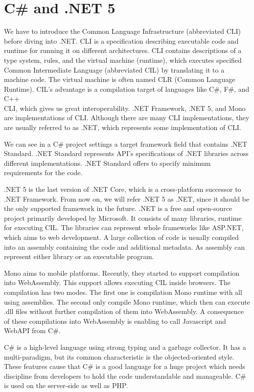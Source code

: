 \section{C\# and .NET 5}

We have to introduce the Common Language Infrastructure (abbreviated CLI)  before diving into .NET.
CLI is a specification describing executable code and runtime for running it on different architectures.
CLI contains descriptions of a type system, rules, and the virtual machine (runtime), which executes specified Common Intermediate Language (abbreviated CIL) by translating it to a machine code. 
The virtual machine is often named CLR (Common Language Runtime).
CIL's advantage is a compilation target of languages like C\#, F\#, and C++\\CLI, which gives us great interoperability.
.NET Framework, .NET 5, and Mono are implementations of CLI.
Although there are many CLI implementations, they are usually referred to as .NET, which represents some implementation of CLI.
\par
We can see in a C\# project settings a target framework field that contains .NET Standard.
.NET Standard represents API's specifications of .NET libraries across different implementations.
.NET Standard offers to specify minimum requirements for the code.
\par
.NET 5  is the last version of .NET Core, which is a cross-platform successor to .NET Framework.
From now on, we will refer .NET 5 as .NET, since it should be the only supported framework in the future.
.NET is a free and open-source project primarily developed by Microsoft.
It consists of many libraries, runtime for executing CIL.
The libraries can represent whole frameworks like ASP.NET, which aims to web development.
A large collection of code is usually compiled into an assembly containing the code and additional metadata.
As assembly can represent either library or an executable program.
\par
Mono aims to mobile platforms. 
Recently, they started to support compilation  into WebAssembly.
This support allows executing CIL inside browsers.
The compilation has two modes.
The first one is compilation Mono runtime with all using assemblies.
The second only compile Mono runtime, which then can execute .dll files without further compilation of them into WebAssembly.
A consequence of these compilations into WebAssembly is enabling to call Javascript and WebAPI from C\#.
\par
C\# is a high-level language using strong typing and a garbage collector.
It has a multi-paradigm, but its common characteristic is the objected-oriented style.
These features cause that C\# is a good language for a huge project which needs discipline from developers to hold the code understandable and manageable.
C\# is used on the server-side as well as PHP.

